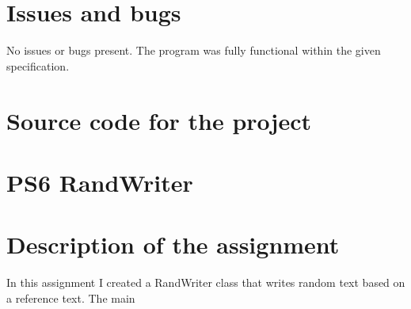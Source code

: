 \documentclass[12pt]{article}
\begin{document}
\section[5]{Issues and bugs}
\hfill\begin{minipage}{\dimexpr\textwidth-1cm}
No issues or bugs present. \newline
The program was fully functional within the given specification.
\end{minipage}

\section[6]{Source code for the project}





\setcounter{section}{0}
\newpage
\section*{PS6 RandWriter}
\section[1]{Description of the assignment}
\hfill\begin{minipage}{\dimexpr\textwidth-1cm}
In this assignment I created a RandWriter class that writes random text based on a reference text. The main
\end{minipage}
\end{document}
